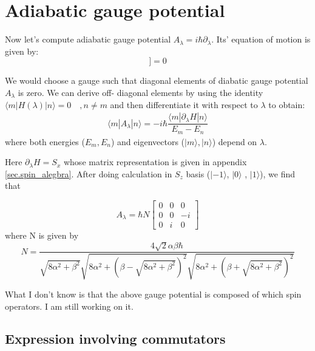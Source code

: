 \documentclass[11pt,a4paper]{article}
\begin{document}
\section{Adiabatic gauge potential}

Now let's compute adiabatic gauge potential $A_{\lambda}= i \hbar \partial_{\lambda}$. Its' equation of motion is given by:
\begin{equation}
[H, \partial_{\lambda} H +\dfrac{i}{\hbar} [A_{\lambda}, H] ]=0
\end{equation}

We would choose a gauge such that diagonal elements of diabatic gauge potential $A_{\lambda}$ is zero. We can derive off- diagonal elements by using the identity $\langle m |H(\lambda) | n \rangle=0 \quad, n \neq m$ and then differentiate it with respect to $\lambda$ to obtain:
\begin{align}
\boxed{\langle m |A_{\lambda} | n \rangle =  -i \hbar \dfrac{\langle m |\partial_{\lambda}H | n \rangle}{E_m-E_n}}
\end{align}
where both  energies ($E_m, E_n$) and eigenvectors ($|m \rangle, |n \rangle$) depend on $\lambda$.

Here $\partial_{\lambda} H=S_x$ whose matrix representation is given in appendix \ref{sec.spin_alegbra}. After doing calculation in $S_z$ basis ($|- 1\rangle$, $| 0 \rangle$ , $| 1 \rangle$), we find that

\begin{equation}
A_{\lambda}=\hbar N
\begin{bmatrix}
0 & 0 & 0\\
0 & 0 & -i \\
0 & i & 0
\end{bmatrix}
\end{equation}
where N is given by
\begin{equation}
N=\dfrac{4\sqrt{2} \alpha \beta \hbar}{\sqrt{8 \alpha^{2} + \beta^{2}} \sqrt{8 \alpha^{2} + \left(\beta - \sqrt{8 \alpha^{2} + \beta^{2}}\right)^{2}} \sqrt{8 \alpha^{2} + \left(\beta + \sqrt{8 \alpha^{2} + \beta^{2}}\right)^{2}}}
\end{equation}

What I don't know is that the above gauge potential is composed of which spin operators. I am still working on it.

\subsection*{Expression involving commutators}
\end{document}

